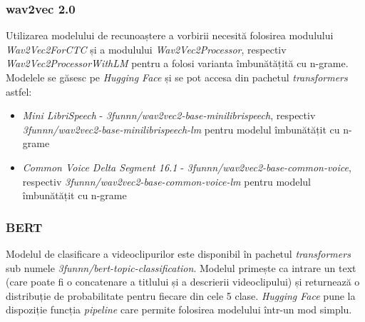 \subsubsection{wav2vec 2.0}
Utilizarea modelului de recunoaștere a vorbirii necesită folosirea modulului \textit{Wav2Vec2ForCTC}
și a modulului \textit{Wav2Vec2Processor}, respectiv \textit{Wav2Vec2ProcessorWithLM} pentru a folosi varianta
îmbunătățită cu n-grame. Modelele se găsesc pe \textit{Hugging Face} și se pot accesa din pachetul \textit{transformers} astfel:

\begin{itemize}
    \item \textit{Mini LibriSpeech} - \textit{3funnn/wav2vec2-base-minilibrispeech}, respectiv \textit{3funnn/wav2vec2-base-minilibrispeech-lm} 
    pentru modelul îmbunătățit cu n-grame
    \item \textit{Common Voice Delta Segment 16.1} - \textit{3funnn/wav2vec2-base-common-voice}, respectiv \textit{3funnn/wav2vec2-base-common-voice-lm}
    pentru modelul îmbunătățit cu n-grame
\end{itemize}

\subsubsection{BERT}
Modelul de clasificare a videoclipurilor este disponibil în pachetul \textit{transformers} sub numele
\textit{3funnn/bert-topic-classification}. Modelul primește ca intrare un text (care poate fi o 
concatenare a titlului și a descrierii videoclipului) și returnează o distribuție de probabilitate
pentru fiecare din cele 5 clase. \textit{Hugging Face} pune la dispoziție funcția \textit{pipeline} care
permite folosirea modelului într-un mod simplu.
